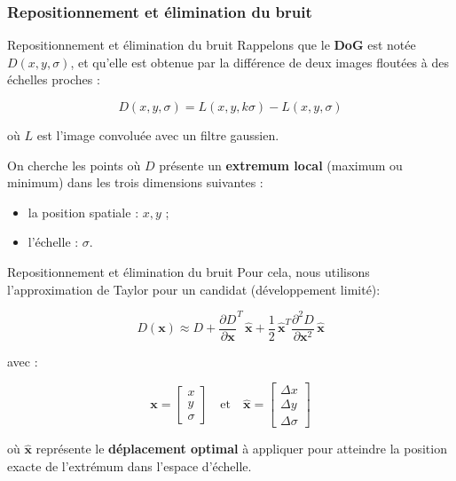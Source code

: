 \documentclass{beamer}
\begin{document}
\subsubsection{Repositionnement et élimination du bruit}
\begin{frame}{Repositionnement et élimination du bruit}
Rappelons que le \textbf{DoG} est notée $D(x, y, \sigma)$, 
et qu'elle est obtenue par la différence de deux images floutées à des échelles proches :

\[
D(x, y, \sigma) = L(x, y, k\sigma) - L(x, y, \sigma)
\]

où $L$ est l'image convoluée avec un filtre gaussien.

\vspace{0.5cm}

On cherche les points où $D$ présente un \textbf{extremum local} (maximum ou minimum) 
dans les trois dimensions suivantes :

\begin{itemize}
    \item la position spatiale : $x, y$ ;
    \item l'échelle : $\sigma$.
\end{itemize}
\end{frame}

\begin{frame}{Repositionnement et élimination du bruit}
Pour cela, nous utilisons l'approximation de Taylor pour un candidat (développement limité):

\[
D(\mathbf{x}) \approx D + 
\frac{\partial D}{\partial \mathbf{x}}^{T} \, \hat{\mathbf{x}} +
\frac{1}{2} \, \hat{\mathbf{x}}^{T} 
\frac{\partial^{2} D}{\partial \mathbf{x}^{2}} \, \hat{\mathbf{x}}
\]

avec :

\[
\mathbf{x} = 
\begin{bmatrix}
x \\[0.2em]
y \\[0.2em]
\sigma
\end{bmatrix}
\quad \text{et} \quad
\hat{\mathbf{x}} =
\begin{bmatrix}
\Delta x \\[0.2em]
\Delta y \\[0.2em]
\Delta \sigma
\end{bmatrix}
\]

\vspace{0.4cm}

où $\hat{\mathbf{x}}$ représente le \textbf{déplacement optimal} à appliquer 
pour atteindre la position exacte de l'extrémum dans l’espace d’échelle.

\end{frame}
\end{document}
